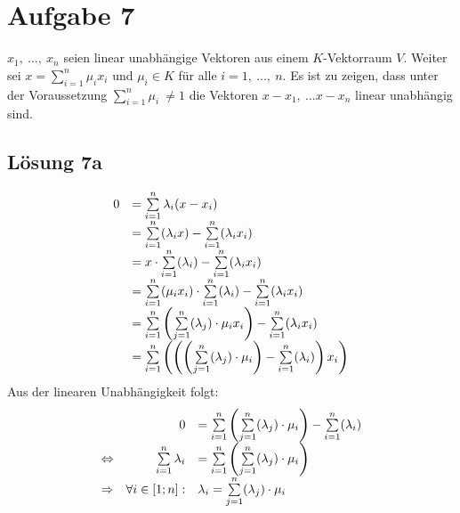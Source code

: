 \documentclass[main.tex]{subfiles}
\begin{document}
\section{Aufgabe 7}

$x_{1} ,\ \dotsc ,\ x_{n}$ seien linear unabhängige Vektoren aus einem $K$-Vektorraum $V$. Weiter sei $x=\sum _{i=1}^{n} \mu _{i} x_{i}$ und $\mu _{i} \in K$ für alle $i=1,\ \dotsc ,\ n$. Es ist zu zeigen, dass unter der Voraussetzung $\sum _{i=1}^{n} \mu _{i} \ \neq 1$ die Vektoren $x-x_{1} ,\ \dotsc x-x_{n}$ linear unabhängig sind.

\subsection{Lösung 7a}

\begin{equation*}
    \begin{array}{ c l }
    0 & =\sum\limits _{i=1}^{n} \lambda _{i}( x-x_{i})\\
    & =\sum\limits _{i=1}^{n}( \lambda _{i} x) -\sum\limits _{i=1}^{n}( \lambda _{i} x_{i})\\
    & =x\cdotp \sum\limits _{i=1}^{n}( \lambda _{i}) -\sum\limits _{i=1}^{n}( \lambda _{i} x_{i})\\
    & =\sum\limits _{i=1}^{n}( \mu _{i} x_{i}) \cdotp \sum\limits _{i=1}^{n}( \lambda _{i}) -\sum\limits _{i=1}^{n}( \lambda _{i} x_{i})\\
    & =\sum\limits _{i=1}^{n}\left(\sum\limits _{j=1}^{n}( \lambda _{j}) \cdotp \mu _{i} x_{i}\right) -\sum\limits _{i=1}^{n}( \lambda _{i} x_{i})\\
    & =\sum\limits _{i=1}^{n}\left(\left(\left(\sum\limits _{j=1}^{n}( \lambda _{j}) \cdotp \mu _{i}\right) -\sum\limits _{i=1}^{n}( \lambda _{i})\right) x_{i}\right)
    \end{array}
\end{equation*}
Aus der linearen Unabhängigkeit folgt:
\begin{equation*}
    \begin{array}{ c r l }
    & 0 & =\sum\limits _{i=1}^{n}\left(\sum\limits _{j=1}^{n}( \lambda _{j}) \cdotp \mu _{i}\right) -\sum\limits _{i=1}^{n}( \lambda _{i})\\
    \Leftrightarrow  & \sum\limits _{i=1}^{n} \lambda _{i} & =\sum\limits _{i=1}^{n}\left(\sum\limits _{j=1}^{n}( \lambda _{j}) \cdotp \mu _{i}\right)\\
    \Rightarrow  & \forall i\in [ 1;n] : & \lambda _{i} =\sum\limits _{j=1}^{n}( \lambda _{j}) \cdotp \mu _{i}
    \end{array}
\end{equation*}
\end{document}

